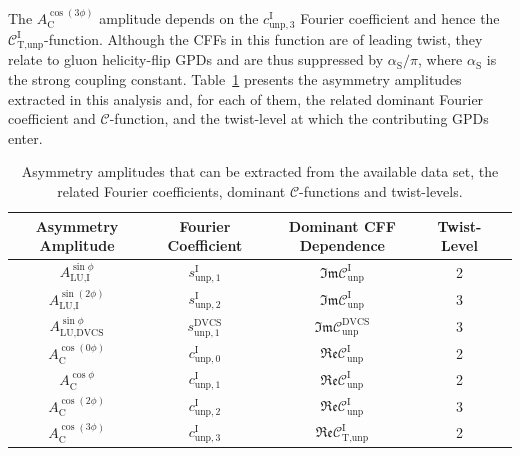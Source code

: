 \documentclass[11pt,a4paper]{article}
\begin{document}
The $A^{\cos(3\phi)}_{\textrm{C}}$ amplitude depends on the
$c_{\textrm{unp},3}^{\textrm{I}}$ Fourier coefficient and hence the
$\mathcal{C}_{\textrm{T,unp}}^{\textrm{I}}$-function. Although the CFFs
in this function are of leading twist, they relate to gluon helicity-flip GPDs and are thus suppressed by $\alpha_{\textrm{S}}/\pi$, where $\alpha_{\textrm{S}}$ is the strong coupling constant. Table~\ref{tab_amplitudes} presents the asymmetry amplitudes extracted in this analysis and, for each of them, the
related dominant Fourier coefficient and $\mathcal{C}$-function, and the twist-level at which the contributing GPDs enter.
\begin{table}
\begin{center}
\resizebox{\textwidth}{!} {
\begin{tabular}{|c|c|c|c|c|}
\hline
Asymmetry Amplitude& Fourier Coefficient& Dominant CFF Dependence & Twist-Level   \\ 
\hline
\hline
$A_{\textrm{LU,I}}^{\sin\phi}$ & $s_{\textrm{unp},1}^{\textrm{I}}$  &
$\mathfrak{Im}\mathcal{C}_{\textrm{unp}}^{\textrm{I}}$
&  2 \\
\hline
$A_{\textrm{LU,I}}^{\sin(2\phi)}$ & $s_{\textrm{unp},2}^{\textrm{I}}$ 
&
$\mathfrak{Im}\mathcal{C}_{\textrm{unp}}^{\textrm{I}}$
&  3 \\
\hline
\hline
$A_{\textrm{LU,DVCS}}^{\sin\phi}$ & $s_{\textrm{unp},1}^{\textrm{DVCS}}$ &
$\mathfrak{Im}\mathcal{C}_{\textrm{unp}}^{\textrm{DVCS}}$ &  3 \\
\hline
\hline
$A_{\textrm{C}}^{\cos(0\phi)}$ & $c_{\textrm{unp},0}^{\textrm{I}}$  &
$\mathfrak{Re}\mathcal{C}_{\textrm{unp}}^{\textrm{I}}$ & 2
\\
\hline
$A_{\textrm{C}}^{\cos\phi}$ & $c_{\textrm{unp},1}^{\textrm{I}}$  &
$\mathfrak{Re}\mathcal{C}_{\textrm{unp}}^{\textrm{I}}$ & 2
\\
\hline
$A_{\textrm{C}}^{\cos(2\phi)}$ & $c_{\textrm{unp},2}^{\textrm{I}}$ &
$\mathfrak{Re}\mathcal{C}_{\textrm{unp}}^{\textrm{I}}$ & 3 \\
\hline
$A_{\textrm{C}}^{\cos(3\phi)}$ & $c_{\textrm{unp},3}^{\textrm{I}}$ &
$\mathfrak{Re}\mathcal{C}_{\textrm{T,unp}}^{\textrm{I}}$ &  2 \\
\hline
 \end{tabular}
}
\caption{Asymmetry amplitudes that can
be extracted from the available data set, the related Fourier
coefficients, dominant $\mathcal{C}$-functions and twist-levels.}
\label{tab_amplitudes}
\end{center}
\end{table}
 
\end{document}
